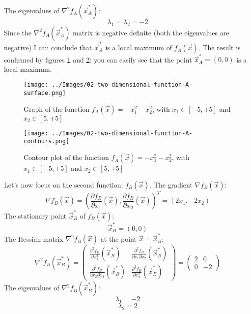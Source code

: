     The eigenvalues of \(\nabla^2 f_A(\vec{x}^*_A)\):
    \[\lambda_1 = \lambda_2 = -2\]
    Since the \(\nabla^2 f_A(\vec{x}_A^*)\) matrix is negative definite (both the eigenvalues are negative) I can conclude that \(\vec{x}^*_A\) is a local maximum of \(f_A(\vec{x})\). The result is confirmed by figures \ref{two-dimensional-function-A-surface} and \ref{two-dimensional-function-A-contours}: you can easily see that the point \(\vec{x}_A^* = (0, 0)\) is a local maximum.\par
    \begin{figure}
        \centering
        \texttt{[image: ../Images/02-two-dimensional-function-A-surface.png]}
        \caption{Graph of the function \(f_A(\vec{x}) = - x_{1}^{2} - x_{2}^{2}\), with \(x_1 \in [-5, +5]\) and \(x_2 \in [5, +5]\)}
        \label{two-dimensional-function-A-surface}
    \end{figure}
    \begin{figure}
        \centering
        \texttt{[image: ../Images/02-two-dimensional-function-A-contours.png]}
        \caption{Contour plot of the function \(f_A(\vec{x}) = - x_{1}^{2} - x_{2}^{2}\), with \(x_1 \in [-5, +5]\) and \(x_2 \in [5, +5]\)}
        \label{two-dimensional-function-A-contours}
    \end{figure}
    Let's now focus on the second function: \(f_B(\vec{x})\). The gradient \(\nabla f_B(\vec{x})\):
    \[\nabla f_B(\vec{x}) = \left (\frac{\partial f_B}{\partial x_1}(\vec{x}), \frac{\partial f_B}{\partial x_2}(\vec{x}) \right )^T = (2x_1, -2x_2)\]
    The stationary point \(\vec{x}_B^*\) of \(f_B(\vec{x})\):
    \[\vec{x}_B^* = (0, 0)\]
    The Hessian matrix \(\nabla^2 f_B(\vec{x})\) at the point \(\vec{x} = \vec{x}_B^*\):
    \[
        \nabla^2 f_B(\vec{x}_B^*) =
        \begin{pmatrix}
            \frac{\partial^2 f_B}{\partial x_1^2}(\vec{x}^*_B) &
            \frac{\partial^2 f_B}{\partial x_1 \partial x_2}(\vec{x}^*_B) \\
            \frac{\partial^2 f_B}{\partial x_2 \partial x_1}(\vec{x}^*_B) &
            \frac{\partial^2 f_B}{\partial x_2^2}(\vec{x}^*_B)
        \end{pmatrix}
        =
        \begin{pmatrix}
            2 & 0 \\
            0 & -2
        \end{pmatrix}
    \]
    The eigenvalues of \(\nabla^2 f_B(\vec{x}^*_B)\):
    \[\lambda_1 = -2\]
    \[\lambda_2 = 2\]

